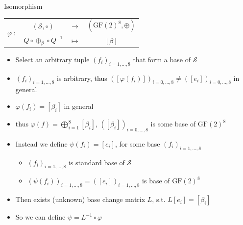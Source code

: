 \documentclass{beamer}
\newcommand{\gf}{\ensuremath{\text{GF}\left(2\right)}}
\begin{document}
\begin{frame}
\begin{block}{Isomorphism}
    \begin{center}
    \begin{tabular}{ r  c c c }
	\multirow{2}{*}{$\varphi \; :$} & $(\mathcal{S}, \circ )$  & $\longrightarrow$ & $(\gf^8, \oplus)$ \\
	                                & $Q \circ \oplus_{\beta} \circ Q^{-1} $ & $\longmapsto$ & $\left[ \beta \right]$
    \end{tabular}
    \end{center}
\end{block}
\begin{itemize}
 \item Select an \alert{arbitrary} tuple $(f_i)_{i=1,\dots,8}$ that form a base of $\mathcal{S}$ \pause
 \item $(f_i)_{i=1,\dots,8}$ is arbitrary, thus $([\varphi(f_i)])_{i=0,\dots,8} \neq ([e_i])_{i=0,\dots,8} $ in general \pause
 \item $\varphi(f_i) = [\beta_i]$ in general \pause
 \item thus $\varphi(f) = \bigoplus_{i=1}^8 [\beta_i]$, $([\beta_i])_{i=0,\dots,8}$ is \alert{some} base of $\gf^8$ \pause

 \item Instead we define $\psi(f_i) = [e_i]$, for some base  $(f_i)_{i=1,\dots,8}$ 
    \begin{itemize}
	 \item $(f_i)_{i=1,\dots,8}$ is standard base of $\mathcal{S}$
	 \item $(\psi(f_i))_{i=1,\dots,8}=([e_i])_{i=1,\dots,8}$ is base of $\gf^8$
    \end{itemize}	  \pause
 \item Then exists (unknown) base change matrix $L$, s.t. $L[e_i] = [\beta_i]$
 \item So we can define $\psi = L^{-1} \circ \varphi$ 
    

\end{itemize}

\end{frame}
\end{document}
